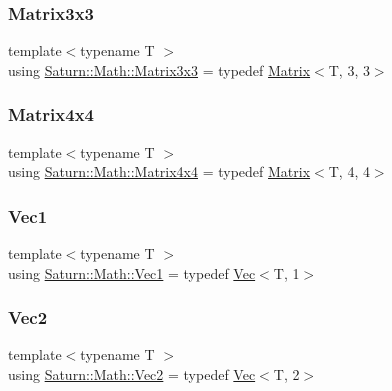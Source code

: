 \subsubsection{\texorpdfstring{Matrix3x3}{Matrix3x3}}
{\footnotesize\ttfamily template$<$typename T $>$ \\
using \mbox{\hyperlink{namespace_saturn_1_1_math_abf8f005e656124507aa01d3fe30156a5}{Saturn\+::\+Math\+::\+Matrix3x3}} = typedef \mbox{\hyperlink{class_saturn_1_1_math_1_1_matrix}{Matrix}}$<$T, 3, 3$>$}

\mbox{\label{namespace_saturn_1_1_math_a139080fa8f37f668ebd8f6c58a0cea63}} 
\subsubsection{\texorpdfstring{Matrix4x4}{Matrix4x4}}
{\footnotesize\ttfamily template$<$typename T $>$ \\
using \mbox{\hyperlink{namespace_saturn_1_1_math_a139080fa8f37f668ebd8f6c58a0cea63}{Saturn\+::\+Math\+::\+Matrix4x4}} = typedef \mbox{\hyperlink{class_saturn_1_1_math_1_1_matrix}{Matrix}}$<$T, 4, 4$>$}

\mbox{\label{namespace_saturn_1_1_math_acae4f808f0c3284d0b60ee1ac720deaa}} 
\subsubsection{\texorpdfstring{Vec1}{Vec1}}
{\footnotesize\ttfamily template$<$typename T $>$ \\
using \mbox{\hyperlink{namespace_saturn_1_1_math_acae4f808f0c3284d0b60ee1ac720deaa}{Saturn\+::\+Math\+::\+Vec1}} = typedef \mbox{\hyperlink{class_saturn_1_1_math_1_1_vec}{Vec}}$<$T, 1$>$}

\mbox{\label{namespace_saturn_1_1_math_a8befc95aeff660bda92b8807c1cc5224}} 
\subsubsection{\texorpdfstring{Vec2}{Vec2}}
{\footnotesize\ttfamily template$<$typename T $>$ \\
using \mbox{\hyperlink{namespace_saturn_1_1_math_a8befc95aeff660bda92b8807c1cc5224}{Saturn\+::\+Math\+::\+Vec2}} = typedef \mbox{\hyperlink{class_saturn_1_1_math_1_1_vec}{Vec}}$<$T, 2$>$}

